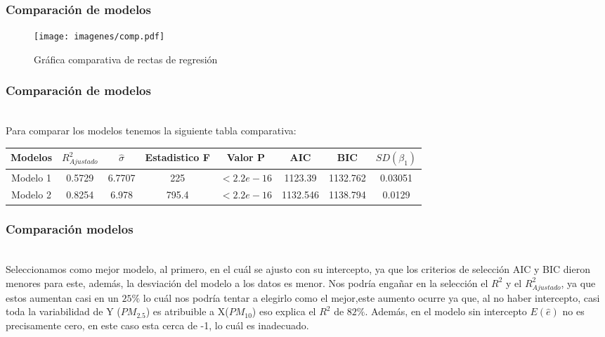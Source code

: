 \documentclass[12pt]{beamer}
\begin{document}
\begin{frame}
\frametitle{Comparación de modelos}
\begin{figure}[h]
  \centering
  \texttt{[image: imagenes/comp.pdf]}
  \caption{Gráfica comparativa de rectas de regresión}\label{figura1}
\end{figure}
\end{frame}

\begin{frame}
\frametitle{Comparación de modelos}
~\\Para comparar los modelos tenemos la siguiente tabla comparativa:
\resizebox{12.2cm}{!} {
\begin{tabular}{|c|c|c|c|c|c|c|c|}
 \hline 
 Modelos & $R^{2}_{Ajustado}$ & $\hat{\sigma}$ & Estadistico F & Valor P & AIC & BIC & $SD(\beta_{1})$ \\ 
 \hline 
 Modelo 1 & 0.5729 & 6.7707 & 225 & $<2.2e-16$ & 1123.39 & 1132.762 & 0.03051  \\ 
 \hline 
 Modelo 2 & 0.8254 & 6.978 & 795.4 & $<2.2e-16$ & 1132.546 & 1138.794 & 0.0129\\ 
 \hline 
 \end{tabular}
 }  
\end{frame}

\begin{frame}
\frametitle{Comparación modelos}
~\\Seleccionamos como mejor modelo, al primero, en el cuál se ajusto con su intercepto, ya que los criterios de selección AIC y BIC dieron menores para este, además, la desviación del modelo a los datos es menor. Nos podría engañar en la selección el $R^2$ y el $R^2_{Ajustado}$, ya que estos aumentan casi en un $25\%$ lo cuál nos podría tentar a elegirlo como el mejor,este aumento ocurre ya que, al no haber intercepto, casi toda la variabilidad de Y ($PM_{2.5}$) es atribuible a X($PM_{10}$) eso explica el $R^2$ de $82\%$. Además, en el modelo sin intercepto $E(\hat{e})$ no es precisamente cero, en este caso esta cerca de -1, lo cuál es inadecuado.
\end{frame}
\end{document}
